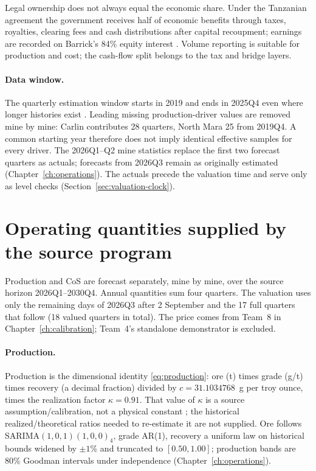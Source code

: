 Legal ownership does not always equal the economic share. Under the Tanzanian
agreement the government receives half of economic benefits through taxes,
royalties, clearing fees and cash distributions after capital recoupment;
earnings are recorded on Barrick's 84\% equity interest
\cite{barrick-ar-2025}. Volume reporting is suitable for production and cost;
the cash-flow split belongs to the tax and bridge layers.

\paragraph{Data window.}
The quarterly estimation window starts in 2019 and ends in 2025Q4 even where
longer histories exist \cite{team4}. Leading missing production-driver values
are removed mine by mine: Carlin contributes 28 quarters, North Mara 25 from
2019Q4. A common starting year therefore does not imply identical effective
samples for every driver. The 2026Q1--Q2 mine statistics replace the first
two forecast quarters as actuals; forecasts from 2026Q3 remain as originally
estimated (Chapter~\ref{ch:operations}). The actuals precede the valuation
time and serve only as level checks (Section~\ref{sec:valuation-clock}).

\section{Operating quantities supplied by the source program}
\label{sec:company-operating-quantities}

Production and CoS are forecast separately, mine by mine, over the source
horizon 2026Q1--2030Q4. Annual quantities sum four quarters. The valuation
uses only the remaining \StubDays{} days of 2026Q3 after 2 September and the
17 full quarters that follow (18 valued quarters in total). The price comes from Team~8 in
Chapter~\ref{ch:calibration}; Team~4's standalone demonstrator is excluded.

\paragraph{Production.}
Production is the dimensional identity \eqref{eq:production}: ore (t) times
grade (g/t) times recovery (a decimal fraction) divided by
$c=31.1034768$~g per troy ounce, times the realization factor $\kappa=0.91$.
That value of $\kappa$ is a source assumption/calibration, not a physical
constant \cite{team4}; the historical realized/theoretical ratios needed to
re-estimate it are not supplied. Ore follows SARIMA$(1,0,1)(1,0,0)_4$, grade
AR(1), recovery a uniform law on historical bounds widened by $\pm1\%$ and
truncated to $[0.50,1.00]$; production bands are 80\% Goodman intervals under
independence (Chapter~\ref{ch:operations}).

